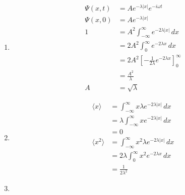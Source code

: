\documentclass{article}
\begin{document}
\begin{enumerate}
  \item

        \begin{align*}
          \Psi(x, t) & = A e^{-\lambda |x|} e^{-i \omega t}                                  \\
          \Psi(x, 0) & = A e^{-\lambda |x|}                                                  \\
          1          & = A^2 \int_{-\infty}^\infty e^{-2 \lambda |x|} \,d x                  \\
                     & = 2 A^2 \int_0^\infty e^{-2 \lambda x} \,d x                          \\
                     & = 2 A^2 \left[ -\frac{1}{2 \lambda} e^{-2 \lambda x} \right]_0^\infty \\
                     & = \frac{A^2}{\lambda}                                                 \\
          A          & = \sqrt{\lambda}
        \end{align*}

  \item

        \begin{align*}
          \langle x \rangle   & = \int_{-\infty}^\infty x \lambda e^{-2 \lambda |x|} \,d x   \\
                              & = \lambda \int_{-\infty}^\infty x e^{-2 \lambda |x|} \,d x   \\
                              & = 0                                                          \\
          \langle x^2 \rangle & = \int_{-\infty}^\infty x^2 \lambda e^{-2 \lambda |x|} \,d x \\
                              & = 2 \lambda \int_0^\infty x^2 e^{-2 \lambda x} \,d x         \\
                              & = \frac{1}{2 \lambda^2}
        \end{align*}

  \item


\end{enumerate}
\end{document}
